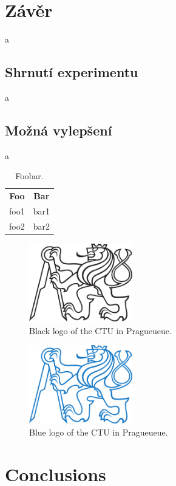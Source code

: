 \documentclass[twoside]{ctuthesis}
\theoremstyle{plain}
\theoremstyle{definition}
\theoremstyle{note}
\begin{document}
\chapter{Závěr}
a
\section{Shrnutí experimentu}
a
\section{Možná vylepšení}
a

\begin{table}
\begin{ctucolortab}
\begin{tabular}{cc}
\bfseries Foo & \bfseries Bar \\\Midrule
foo1 & bar1 \\
foo2 & bar2
\end{tabular}
\end{ctucolortab}
\caption{Foobar.}
\label{tab:foobar}
\end{table}

\begin{figure}
\includegraphics[width=0.4\textwidth]{ctu_logo_black}
\caption{Black logo of the CTU in Pragueueue.}
\end{figure}

\begin{figure}[!t]
\includegraphics[width=0.4\textwidth]{ctu_logo_blue}
\caption{Blue logo of the CTU in Pragueueue.}
\end{figure}

\chapter{Conclusions}
\end{document}
